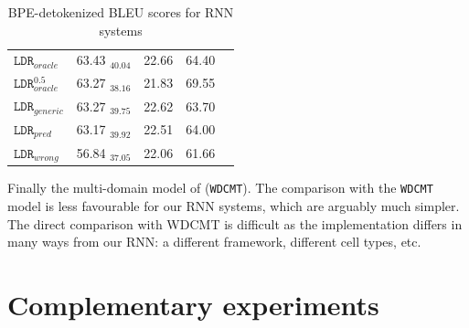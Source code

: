 \documentclass[a4paper]{article}
\newcommand{\jcTodo}[1]{\Todo[JC:]{\textcolor{orange}{#1}}}
\begin{document}
\begin{table}[!h]
\begin{center}
{\begin{tabular}{|l|ccc|c|}
\hline
$\mathtt{LDR}_{oracle}$     & 63.43 $_{40.04}$ & 22.66 & 64.40 & \\
$\mathtt{LDR}_{oracle}^{0.5}$   & 63.27 $_{38.16}$ & 21.83 & 69.55 & \\
$\mathtt{LDR}_{generic}$   & 63.27 $_{39.75}$ & 22.62 & 63.70 & \\
$\mathtt{LDR}_{pred}$        & 63.17 $_{39.92}$ & 22.51 & 64.00 & \\
$\mathtt{LDR}_{wrong}$     & 56.84 $_{37.05}$ & 22.06 & 61.66 & \\
\hline
\end{tabular}
} %
\end{center}
\caption{BPE-detokenized BLEU scores for RNN systems\label{tab:results-rnn}}
\end{table}


\jcTodo{introduce WDCMT experiments}
Finally the multi-domain model of \cite{Zeng18multidomain} (\texttt{WDCMT}).
The comparison with the \texttt{WDCMT} model is less favourable for our RNN systems, which are arguably much simpler.
The direct comparison with WDCMT is difficult as the implementation differs in many ways from our RNN: a different framework, different cell types,  etc.

\begin{table}[!h]
\begin{center}
\end{center}
\caption{BPE-detokenized BLEU scores for RNN systems\label{tab:results-rnn-wdcmt}}
\end{table}

\section{Complementary experiments\label{sec:Discussion}}
\end{document}
